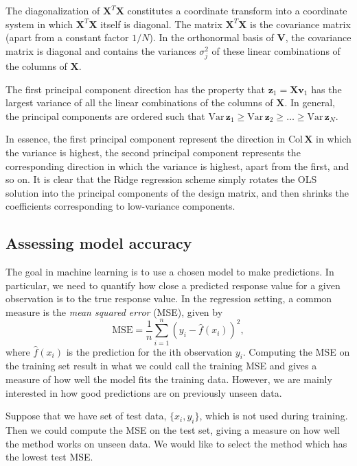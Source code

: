 \documentclass[a4paper]{article}
\begin{document}
\begin{multicols}{2}
The diagonalization of $\mathbf{X}^T\mathbf{X}$ constitutes a coordinate transform into a coordinate system in which $\mathbf{X}^T\mathbf{X}$ itself is diagonal. The matrix $\mathbf{X}^T\mathbf{X}$ is the covariance matrix (apart from a constant factor $1/N$). In the orthonormal basis of $\mathbf{V}$, the covariance matrix is diagonal and contains the variances $\sigma_j^2$ of these linear combinations of the columns of $\mathbf{X}$.

The first principal component direction has the property that $\mathbf{z}_1=\mathbf{X}\mathbf{v}_1$ has the largest variance of all the linear combinations of the columns of $\mathbf{X}$. In general, the principal components are ordered such that $\text{Var}\,\mathbf{z}_1\ge \text{Var}\,\mathbf{z}_2\ge\dots \ge\text{Var}\,\mathbf{z}_N$.

In essence, the first principal component represent the direction in $\text{Col}\,\mathbf{X}$ in which the variance is highest, the second principal component represents the corresponding direction in which the variance is highest, apart from the first, and so on. It is clear that the Ridge regression scheme simply rotates the OLS solution into the principal components of the design matrix, and then shrinks the coefficients corresponding to low-variance components. 

\subsection{Assessing model accuracy}
The goal in machine learning is to use a chosen model to make predictions. In particular, we need to quantify how close 
a predicted response value for a given observation is to the true response value.
In the regression setting, a common measure is the \textit{mean squared error} (MSE), given by 
\begin{equation}
 \text{MSE} = \frac{1}{n} \sum_{i=1}^n \left( y_i - \hat{f}(x_i) \right)^2,
\end{equation}
where $\hat{f}(x_i)$ is the prediction for the ith observation $y_i$. Computing the MSE on the training set result in what we 
could call the training MSE and gives a measure of how well the model fits the training data. However, we are mainly interested 
in how good predictions are on previously unseen data.

Suppose that we have set of test data, $\{x_i,y_i\}$, which is not used during training. Then we could compute the MSE on 
the test set, giving a measure on how well the method works on unseen data. We would like to select the method which has 
the lowest test MSE. 


\end{multicols}
\end{document}
